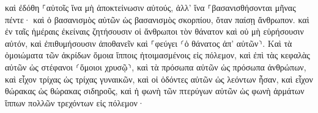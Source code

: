 \documentclass{openreader}
\begin{document}
καὶ ἐδόθη ⸀αὐτοῖς ἵνα μὴ ἀποκτείνωσιν αὐτούς, ἀλλ’ ἵνα ⸀βασανισθήσονται μῆνας πέντε· καὶ ὁ βασανισμὸς αὐτῶν ὡς βασανισμὸς σκορπίου, ὅταν παίσῃ ἄνθρωπον. 
καὶ ἐν ταῖς ἡμέραις ἐκείναις ζητήσουσιν οἱ ἄνθρωποι τὸν θάνατον καὶ οὐ μὴ εὑρήσουσιν αὐτόν, καὶ ἐπιθυμήσουσιν ἀποθανεῖν καὶ ⸀φεύγει ⸂ὁ θάνατος ἀπ’ αὐτῶν⸃. 
Καὶ τὰ ὁμοιώματα τῶν ἀκρίδων ὅμοια ἵπποις ἡτοιμασμένοις εἰς πόλεμον, καὶ ἐπὶ τὰς κεφαλὰς αὐτῶν ὡς στέφανοι ⸂ὅμοιοι χρυσῷ⸃, καὶ τὰ πρόσωπα αὐτῶν ὡς πρόσωπα ἀνθρώπων, 
καὶ εἶχον τρίχας ὡς τρίχας γυναικῶν, καὶ οἱ ὀδόντες αὐτῶν ὡς λεόντων ἦσαν, 
καὶ εἶχον θώρακας ὡς θώρακας σιδηροῦς, καὶ ἡ φωνὴ τῶν πτερύγων αὐτῶν ὡς φωνὴ ἁρμάτων ἵππων πολλῶν τρεχόντων εἰς πόλεμον· 
\end{document}
